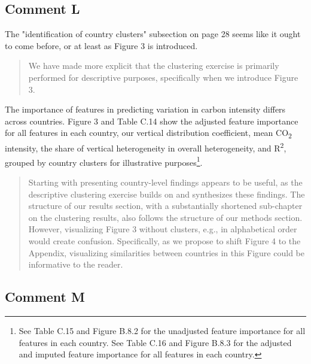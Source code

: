\documentclass[11pt]{article}
\newenvironment{response}
{\begin{quote}\color{black}}
{\end{quote}}
\begin{document}
\subsection*{Comment L}\label{comment_R1_L}

\begin{commentbox}
    The "identification of country clusters" subsection on page 28 seems like it ought to come before, or at least as Figure 3 is introduced.
\end{commentbox}

\begin{response}
    We have made more explicit that the clustering exercise is primarily performed for descriptive purposes, specifically when we introduce Figure 3.
\end{response}

\begin{revisionbox}
    The importance of features in predicting variation in carbon intensity differs across countries. Figure 3 and Table C.14 show the adjusted feature importance for all features in each country, our vertical distribution coefficient, mean CO\textsubscript{2} intensity, the share of vertical heterogeneity in overall heterogeneity, and R\textsuperscript{2}, grouped by country clusters for illustrative purposes\footnote{See Table C.15 and Figure B.8.2 for the unadjusted feature importance for all features in each country. See Table C.16 and Figure B.8.3 for the adjusted and imputed feature importance for all features in each country.}.
\end{revisionbox}

\begin{response}
    Starting with presenting country-level findings appears to be useful, as the descriptive clustering exercise builds on and synthesizes these findings. The structure of our results section, with a substantially shortened sub-chapter on the clustering results, also follows the structure of our methods section. However, visualizing Figure 3 without clusters, e.g., in alphabetical order would create confusion. Specifically, as we propose to shift Figure 4 to the Appendix, visualizing similarities between countries in this Figure could be informative to the reader.
\end{response}

\subsection*{Comment M}\label{comment_R1_M}
\end{document}
